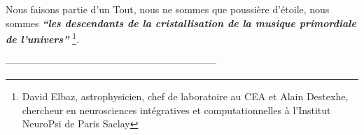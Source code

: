 Nous faisons partie d'un Tout, nous ne sommes que poussière d'étoile,
nous sommes
\textit{\textbf{``les descendants de la  cristallisation de la musique primordiale de
l'univers''}} \autocite{delbaz_recherche_2016} \footnote{David Elbaz, astrophysicien, chef de laboratoire au CEA et Alain
Destexhe, chercheur en neurosciences intégratives et computationnelles
à l'Institut  NeuroPsi de Paris Saclay}.



-----------------------------------------------------------------









